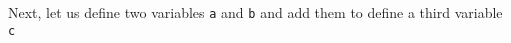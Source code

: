 Next, let us define two variables \lstinline{a} and \lstinline{b} and add them to define a third variable \lstinline{c}